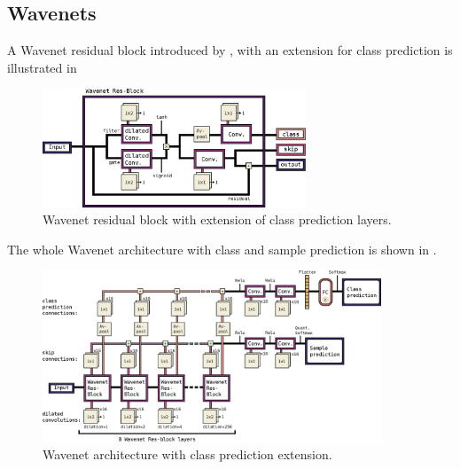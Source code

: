 \subsection{Wavenets}\label{sec:nn_arch_wavenet}

A Wavenet residual block introduced by \cite{Oord2016}, with an extension for class prediction is illustrated in  
\begin{figure}[!ht]
  \centering
    \includegraphics[width=0.7\textwidth]{./4_nn/figs/nn_arch_wavenet_block.eps}
  \caption{Wavenet residual block \cite{Oord2016} with extension of class prediction layers.}
  \label{fig:nn_arch_wavenet_block}
\end{figure}
\FloatBarrier
\noindent
The whole Wavenet architecture with class and sample prediction is shown in .
\begin{figure}[!ht]
  \centering
    \includegraphics[width=0.9\textwidth]{./4_nn/figs/nn_arch_wavenet_all.eps}
  \caption{Wavenet architecture with class prediction extension.}
  \label{fig:nn_arch_wavenet_all}
\end{figure}
\FloatBarrier
\noindent

